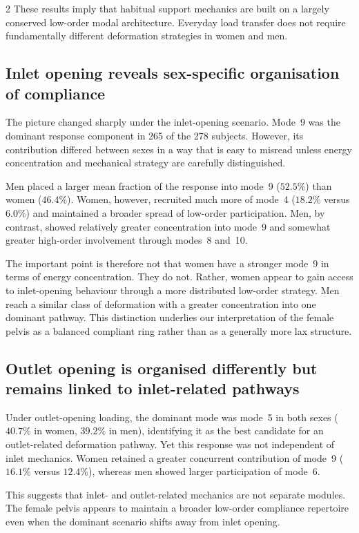 \documentclass[openacc]{rsproca_new}
\begin{document}
\begin{multicols}{2}
These results imply that habitual support mechanics are built on a largely conserved low-order modal architecture. Everyday load transfer does not require fundamentally different deformation strategies in women and men.

\subsection{Inlet opening reveals sex-specific organisation of compliance}

The picture changed sharply under the inlet-opening scenario. Mode~9 was the dominant response component in 265 of the 278 subjects. However, its contribution differed between sexes in a way that is easy to misread unless energy concentration and mechanical strategy are carefully distinguished.

Men placed a larger mean fraction of the response into mode~9 ($52.5\%$) than women ($46.4\%$). Women, however, recruited much more of mode~4 ($18.2\%$ versus $6.0\%$) and maintained a broader spread of low-order participation. Men, by contrast, showed relatively greater concentration into mode~9 and somewhat greater high-order involvement through modes~8 and~10.

The important point is therefore not that women have a stronger mode~9 in terms of energy concentration. They do not. Rather, women appear to gain access to inlet-opening behaviour through a more distributed low-order strategy. Men reach a similar class of deformation with a greater concentration into one dominant pathway. This distinction underlies our interpretation of the female pelvis as a balanced compliant ring rather than as a generally more lax structure.

\subsection{Outlet opening is organised differently but remains linked to inlet-related pathways}

Under outlet-opening loading, the dominant mode was mode~5 in both sexes ($40.7\%$ in women, $39.2\%$ in men), identifying it as the best candidate for an outlet-related deformation pathway. Yet this response was not independent of inlet mechanics. Women retained a greater concurrent contribution of mode~9 ($16.1\%$ versus $12.4\%$), whereas men showed larger participation of mode~6.

This suggests that inlet- and outlet-related mechanics are not separate modules. The female pelvis appears to maintain a broader low-order compliance repertoire even when the dominant scenario shifts away from inlet opening.


\end{multicols}
\end{document}
